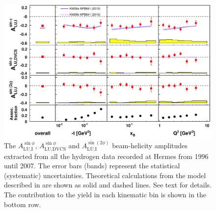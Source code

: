 \begin{figure}
 \begin{center}
 \includegraphics[width=15cm]{bsadvcsplots_eml_par13_bin6_release_all_pic_update}
  \caption{The $A_{\textrm{LU,I}}^{\sin\phi}$, $A_{\textrm{LU,DVCS}}^{\sin\phi}$ and
$A_{\textrm{LU,I}}^{\sin(2\phi)}$ beam-helicity amplitudes extracted from all the hydrogen data recorded at H{\sc ermes}
from 1996 until 2007. The error bars (bands) represent the statistical
(systematic) uncertainties. Theoretical calculations from the model described in \cite{Kum09} are shown as solid and dashed lines. See text for details. The  contribution  to the yield in each kinematic bin is shown in the bottom row.}
  \label{bsa_xbjrange}
 \end{center}
\end{figure}

